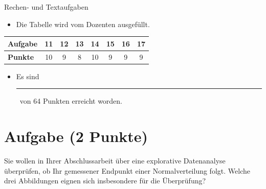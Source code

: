 \documentclass[a4paper, 9pt]{scrartcl}\usepackage[]{graphicx}\usepackage[]{xcolor}
\begin{document}
\begin{graybox}{Rechen- und Textaufgaben}
  \begin{itemize}
  \item Die Tabelle wird vom Dozenten ausgefüllt.
  \end{itemize}
  \begin{center}
    \large
    \begin{tabular}{|l|c|c|c|c|c|c|c|}
      \hline
      \textbf{Aufgabe} & 11 & 12 & 13 & 14 & 15 & 16 & 17 \strut\\
      \hline
      \textbf{Punkte} & 
      \hspace{1Ex}\Large\textcolor{gray!70}{10}\hspace{1Ex}  & 
      \hspace{1Ex}\Large\textcolor{gray!70}{9}\hspace{1Ex}  & 
      \hspace{1Ex}\Large\textcolor{gray!70}{8}\hspace{1Ex}  & 
      \hspace{1Ex}\Large\textcolor{gray!70}{10}\hspace{1Ex}  & 
      \hspace{1Ex}\Large\textcolor{gray!70}{9}\hspace{1Ex}  & 
      \hspace{1Ex}\Large\textcolor{gray!70}{9}\hspace{1Ex}  & 
      \hspace{1Ex}\Large\textcolor{gray!70}{9}\hspace{1Ex} \strut\\
      \hline
  \end{tabular}
\end{center}
\begin{itemize}
\item Es sind \rule[0ex]{2em}{.4pt}\, von 64 Punkten erreicht worden.
\end{itemize}
\end{graybox}

\clearpage


\section{Aufgabe \hfill (2 Punkte)}




Sie wollen in Ihrer Abschlussarbeit über eine explorative Datenanalyse überprüfen, ob Ihr gemessener Endpunkt einer Normalverteilung folgt. Welche drei Abbildungen eignen sich insbesondere für die Überprüfung?
\end{document}
